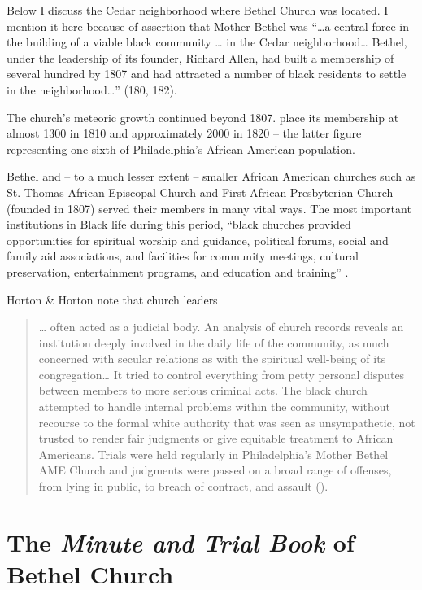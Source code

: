 \documentclass[output=paper,colorlinks,citecolor=brown]{langscibook}
\begin{document}
Below I discuss the Cedar neighborhood where Bethel Church was located. I mention it here because of  assertion that Mother Bethel was “…a central force in the building of a viable black community … in the Cedar neighborhood… Bethel, under the leadership of its founder, Richard Allen, had built a membership of several hundred by 1807 and had attracted a number of black residents to settle in the neighborhood…” (180, 182).

The church’s meteoric growth continued beyond 1807. \citet[139, 142]{HortonHorton1998} place its membership at almost 1300 in 1810 and approximately 2000 in 1820 -- the latter figure representing one-sixth of Philadelphia’s African American population.

Bethel and -- to a much lesser extent -- smaller African American churches such as St. Thomas African Episcopal Church and First African Presbyterian Church (founded in 1807) served their members in many vital ways. The most important institutions in Black life during this period, “black churches provided opportunities for spiritual worship and guidance, political forums, social and family aid associations, and facilities for community meetings, cultural preservation, entertainment programs, and education and training” \citep[130]{HortonHorton1998}.

Horton \& Horton note that church leaders 
\begin{quote}
… often acted as a judicial body. An analysis of church records reveals an institution deeply involved in the daily life of the community, as much concerned with secular relations as with the spiritual well-being of its congregation… It tried to control everything from petty personal disputes between members to more serious criminal acts. The black church attempted to handle internal problems within the community, without recourse to the formal white authority that was seen as unsympathetic, not trusted to render fair judgments or give equitable treatment to African Americans. Trials were held regularly in Philadelphia's Mother Bethel AME Church and judgments were passed on a broad range of offenses, from lying in public, to breach of contract, and assault (\citeyear[147, 148]{HortonHorton1998}).
\end{quote}

\section{The \textit{Minute and Trial Book} of Bethel Church} \label{sec:section3}
\end{document}
